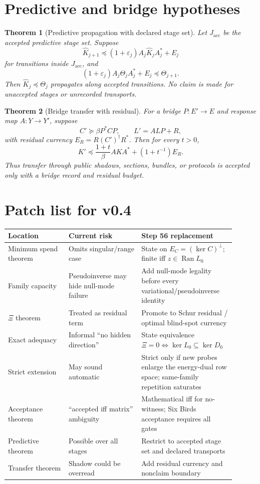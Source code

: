 \documentclass[11pt]{article}
\newtheorem{theorem}{Theorem}[section]
\DeclareMathOperator{\Ran}{Ran}
\newcommand{\Loewner}{\preceq}
\begin{document}
\section{Predictive and bridge hypotheses}

\begin{theorem}[Predictive propagation with declared stage set]
Let $J_{\mathrm{acc}}$ be the accepted predictive stage set.  Suppose
\[
  \widehat K_{j+1}\Loewner (1+\varepsilon_j)A_j\widehat K_jA_j^*+E_j
\]
for transitions inside $J_{\mathrm{acc}}$, and
\[
  (1+\varepsilon_j)A_j\Theta_jA_j^*+E_j\Loewner\Theta_{j+1}.
\]
Then $\widehat K_j\Loewner\Theta_j$ propagates along accepted transitions.  No claim is made for unaccepted stages or unrecorded transports.
\end{theorem}

\begin{theorem}[Bridge transfer with residual]
For a bridge $P:E'\to E$ and response map $A:Y\to Y'$, suppose
\[
  C'\succeq \beta P^*CP,
  \qquad
  L'=ALP+R,
\]
with residual currency $E_R=R(C')^\dagger R^*$.  Then for every $t>0$,
\[
  K'\Loewner \frac{1+t}{\beta}AKA^*+(1+t^{-1})E_R.
\]
Thus transfer through public shadows, sections, bundles, or protocols is accepted only with a bridge record and residual budget.
\end{theorem}

\section{Patch list for v0.4}

\begin{longtable}{p{0.25\linewidth}p{0.30\linewidth}p{0.35\linewidth}}
\toprule
Location & Current risk & Step 56 replacement \\
\midrule
Minimum spend theorem & Omits singular/range case & State on $E_C=(\ker C)^\perp$; finite iff $z\in\Ran L_0$ \\
Family capacity & Pseudoinverse may hide null-mode failure & Add null-mode legality before every variational/pseudoinverse identity \\
\(\Xi\) theorem & Treated as residual term & Promote to Schur residual / optimal blind-spot currency \\
Exact adequacy & Informal ``no hidden direction'' & State equivalence $\Xi=0\iff \ker L_0\subseteq\ker D_0$ \\
Strict extension & May sound automatic & Strict only if new probes enlarge the energy-dual row space; same-family repetition saturates \\
Acceptance theorem & ``accepted iff matrix'' ambiguity & Mathematical iff for no-witness; Six Birds acceptance requires all gates \\
Predictive theorem & Possible over all stages & Restrict to accepted stage set and declared transports \\
Transfer theorem & Shadow could be overread & Add residual currency and nonclaim boundary \\
\bottomrule
\end{longtable}
\end{document}
